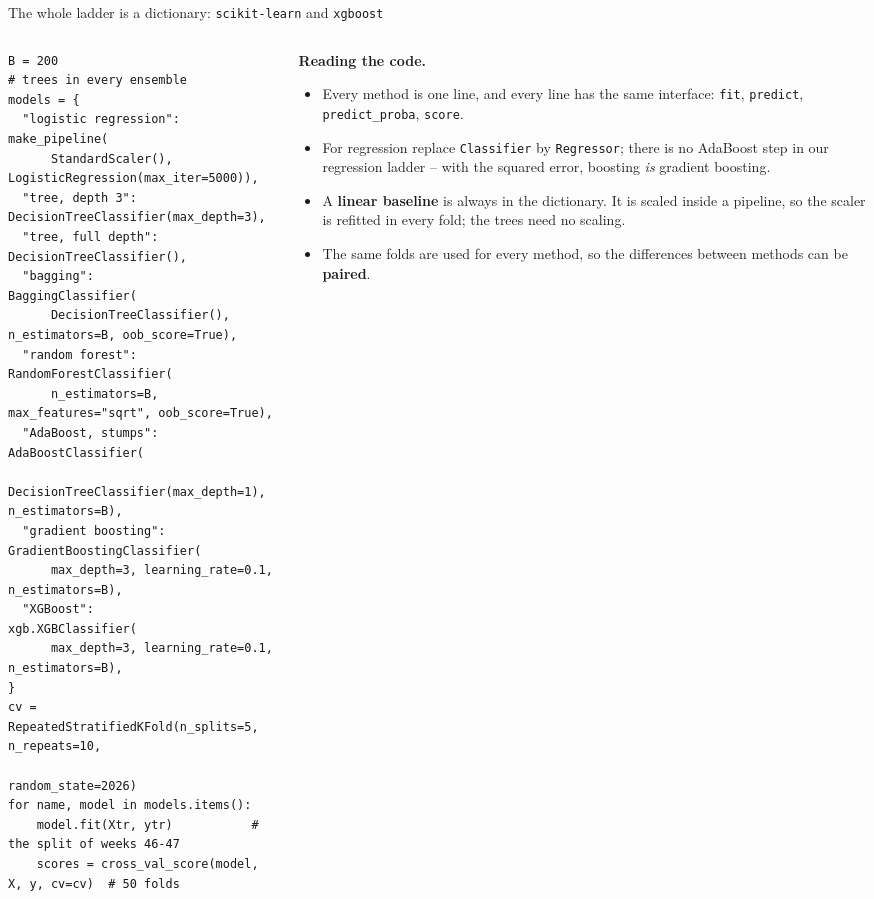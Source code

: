 \documentclass[10pt,aspectratio=169]{beamer}
\begin{document}
\begin{frame}[fragile]{The whole ladder is a dictionary: \texttt{scikit-learn} and \texttt{xgboost}}
\begin{columns}[T]
\begin{column}{0.63\textwidth}
\begin{lstlisting}
B = 200                                 # trees in every ensemble
models = {
  "logistic regression": make_pipeline(
      StandardScaler(), LogisticRegression(max_iter=5000)),
  "tree, depth 3":     DecisionTreeClassifier(max_depth=3),
  "tree, full depth":  DecisionTreeClassifier(),
  "bagging":           BaggingClassifier(
      DecisionTreeClassifier(), n_estimators=B, oob_score=True),
  "random forest":     RandomForestClassifier(
      n_estimators=B, max_features="sqrt", oob_score=True),
  "AdaBoost, stumps":  AdaBoostClassifier(
      DecisionTreeClassifier(max_depth=1), n_estimators=B),
  "gradient boosting": GradientBoostingClassifier(
      max_depth=3, learning_rate=0.1, n_estimators=B),
  "XGBoost":           xgb.XGBClassifier(
      max_depth=3, learning_rate=0.1, n_estimators=B),
}
cv = RepeatedStratifiedKFold(n_splits=5, n_repeats=10,
                             random_state=2026)
for name, model in models.items():
    model.fit(Xtr, ytr)           # the split of weeks 46-47
    scores = cross_val_score(model, X, y, cv=cv)  # 50 folds
\end{lstlisting}
\end{column}
\begin{column}{0.35\textwidth}
\footnotesize
\textbf{Reading the code.}
\begin{itemize}
  \item Every method is one line, and every line has the same interface:
    \texttt{fit}, \texttt{predict}, \texttt{predict\_proba}, \texttt{score}.
  \item For regression replace \texttt{Classifier} by \texttt{Regressor};
    there is no AdaBoost step in our regression ladder -- with the squared
    error, boosting \emph{is} gradient boosting.
  \item A \textbf{linear baseline} is always in the dictionary.  It is
    scaled inside a pipeline, so the scaler is refitted in every fold; the
    trees need no scaling.
  \item The same folds are used for every method, so the differences
    between methods can be \textbf{paired}.
\end{itemize}
\end{column}
\end{columns}
\end{frame}
\end{document}
